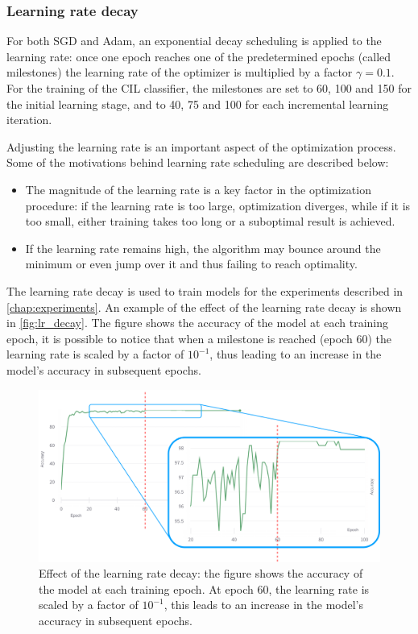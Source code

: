 \subsubsection{Learning rate decay}
For both SGD and Adam, an exponential decay scheduling is applied to the learning rate: once one epoch reaches one of the predetermined epochs (called milestones) the learning rate of the optimizer is multiplied by a factor $\gamma = 0.1$. For the training of the CIL classifier, the milestones are set to 60, 100 and 150 for the initial learning stage, and to 40, 75 and 100 for each incremental learning iteration.

Adjusting the learning rate is an important aspect of the optimization process. Some of the motivations behind learning rate scheduling are described below:
\begin{itemize}
    \item The magnitude of the learning rate is a key factor in the optimization procedure: if the learning rate is too large, optimization diverges, while if it is too small, either training takes too long or a suboptimal result is achieved.
    \item If the learning rate remains high, the algorithm may bounce around the minimum or even jump over it and thus failing to reach optimality. 
\end{itemize}

The learning rate decay is used to train models for the experiments described in \autoref{chap:experiments}. An example of the effect of the learning rate decay is shown in \autoref{fig:lr_decay}. The figure shows the accuracy of the model at each training epoch, it is possible to notice that when a milestone is reached (epoch 60) the learning rate is scaled by a factor of $10^{-1}$, thus leading to an increase in the model's accuracy in subsequent epochs.

\begin{figure}[H]
	\centering

    \begin{center}
        \includegraphics[width=\columnwidth]{images/lr_decay.drawio.png}
    \end{center}

	\caption{Effect of the learning rate decay: the figure shows the accuracy of the model at each training epoch. At epoch 60, the learning rate is scaled by a factor of $10^{-1}$, this leads to an increase in the model's accuracy in subsequent epochs.}
	\label{fig:lr_decay}%
\end{figure}


